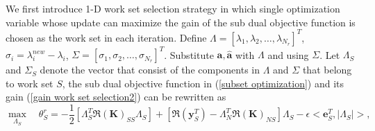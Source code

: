 \documentclass[12pt, draftclsnofoot, onecolumn]{IEEEtran}
\begin{document}
\begin{spacing}{2}
  We first introduce 1-D work set selection strategy in which single optimization variable whose update can maximize the gain of the sub dual objective function is chosen as the work set in each iteration. Define $\Lambda=[\lambda_{1}, \lambda_{2}, \ldots, \lambda_{N_{r}}]^{T}$, $\sigma_{i}=\lambda_{i}^{new}-\lambda_{i}$, $\Sigma=[\sigma_{1}, \sigma_{2}, \ldots, \sigma_{N_{r}}]^{T}$. Substitute $\mathbf{a}, \hat{\mathbf{a}}$ with $\Lambda$ and using $\Sigma$. Let $\Lambda_{S}$ and $\Sigma_{S}$ denote the vector that consist of the components in $\Lambda$ and $\Sigma$ that belong to work set $S$, the sub dual objective function in (\ref{subset optimization}) and its gain (\ref{gain work set selection2}) can be rewritten as 
  \begin{equation}
\max_{\Lambda_{S}}\quad \theta_{S}^{r}=-\frac{1}{2}[\Lambda_{S}^{T}\Re{(\mathbf{K})}_{SS}\Lambda_{S}]+[\Re{(\mathbf{y}_{S}^{T})}-\Lambda_{N}^{T}\Re{(\mathbf{K})}_{NS}
]\Lambda_{S}-\epsilon<\mathbf{e}_{S}^{T}, |\Lambda_{S}|>,
\label{subset optimization lambda}
\end{equation}


\end{spacing}
\end{document}
